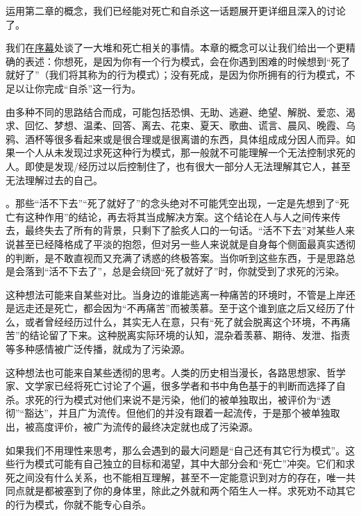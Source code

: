 
运用第二章的概念，我们已经能对死亡和自杀这一话题展开更详细且深入的讨论了。

我们在\hyperref[chap:wedge]{序幕}处谈了一大堆和死亡相关的事情。本章的概念可以让我们给出一个更精确的表述：你想死，是因为你有一个行为模式，会在你遇到困难的时候想到“死了就好了”（我们将其称为的行为模式）；没有死成，是因为你所拥有的行为模式，不足以让你完成“自杀”这一行为。

由多种不同的思路结合而成，可能包括恐惧、无助、逃避、绝望、解脱、爱恋、渴求、回忆、梦想、温柔、回答、离去、花束、夏天、歌曲、谎言、晨风、晚霞、乌鸦、酒杯等很多看起来或是很合理或是很离谱的东西，具体组成成分因人而异。如果一个人从未发现过求死这种行为模式，那一般就不可能理解一个无法控制求死的人。即使是发现/经历过以后控制住了，也有很大一部分人无法理解其它人，甚至无法理解过去的自己。

。那些“活不下去”“死了就好了”的念头绝对不可能凭空出现，一定是先想到了“死亡有这种作用”的结论，再去将其当成解决方案。这个结论在人与人之间传来传去，最终失去了所有的背景，只剩下了脍炙人口的一句话。“活不下去”对某些人来说甚至已经降格成了平淡的抱怨，但对另一些人来说就是自身每个侧面最真实透彻的判断，是不敢直视而又充满了诱惑的终极答案。当你听到这些东西，于是思路总是会落到“活不下去了”，总是会绕回“死了就好了”时，你就受到了求死的污染。

这种想法可能来自某些对比。当身边的谁能逃离一种痛苦的环境时，不管是上岸还是远走还是死亡，都会因为“不再痛苦”而被羡慕。至于这个谁到底之后又经历了什么，或者曾经经历过什么，其实无人在意，只有“死了就会脱离这个环境，不再痛苦”的结论留了下来。这种脱离实际环境的认知，混杂着羡慕、期待、发泄、指责等多种感情被广泛传播，就成为了污染源。

这种想法也可能来自某些透彻的思考。人类的历史相当漫长，各路思想家、哲学家、文学家已经将死亡讨论了个遍，很多学者和书中角色基于的判断而选择了自杀。求死的行为模式对他们来说不是污染，他们的被单独取出，被评价为“透彻”“豁达”，并且广为流传。但他们的并没有跟着一起流传，于是那个被单独取出，被高度评价，被广为流传的最终决定就也成了污染源。

如果我们不用理性来思考，那么会遇到的最大问题是“自己还有其它行为模式”。这些行为模式可能有自己独立的目标和渴望，其中大部分会和“死亡”冲突。它们和求死之间没有什么关系，也不能相互理解，甚至不一定能意识到对方的存在，唯一共同点就是都被塞到了你的身体里，除此之外就和两个陌生人一样。求死劝不动其它的行为模式，你就不能专心自杀。

